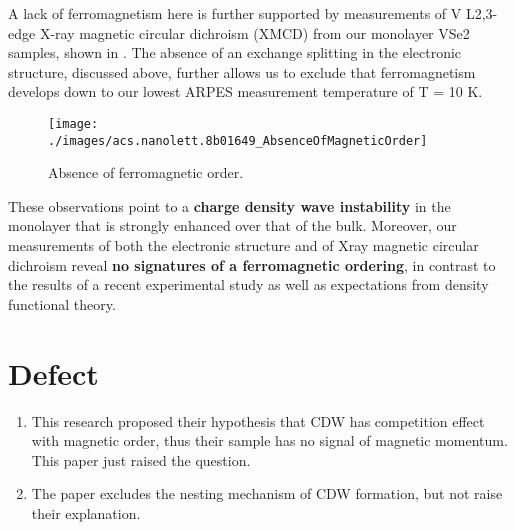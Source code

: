 A lack of ferromagnetism here is further supported by measurements of V L2,3-edge X-ray magnetic circular dichroism (XMCD) from our monolayer VSe2 samples, shown in . The absence of an exchange splitting in the electronic structure, discussed above, further allows us to exclude that ferromagnetism develops down to our lowest ARPES measurement temperature of T = 10 K.

\begin{figure}[ht] 
    \texttt{[image: ./images/acs.nanolett.8b01649\_AbsenceOfMagneticOrder]}
	\caption[Absence of ferromagnetic order]{
		Absence of ferromagnetic order.
	}
\end{figure}

These observations point to a \textbf{charge density wave instability} in the monolayer that is strongly enhanced over that of the bulk. Moreover, our measurements of both the electronic structure and of Xray magnetic circular dichroism reveal \textbf{no signatures of a ferromagnetic ordering}, in contrast to the results of a recent experimental study as well as expectations from density functional theory.

\section{Defect}

\begin{enumerate}
    \item This research proposed their hypothesis that CDW has competition effect with magnetic order, thus their sample has no signal of magnetic momentum. This paper just raised the question.
    \item The paper excludes the nesting mechanism of CDW formation, but not raise their explanation.
\end{enumerate}
